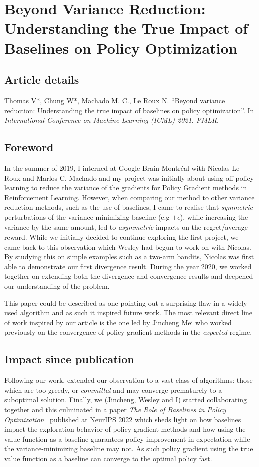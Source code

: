 \chapter{Beyond Variance Reduction: Understanding the True Impact of Baselines on Policy Optimization}
\label{chapter:baselines}
\section*{Article details}
Thomas V*, Chung W*, Machado M. C., Le Roux N. ``Beyond variance reduction: Understanding the true impact of baselines on policy optimization''. In \emph{International Conference on Machine Learning (ICML) 2021. PMLR}.

\section*{Foreword}
In the summer of 2019, I interned at Google Brain Montr\'{e}al with Nicolas Le Roux and Marlos C. Machado and my project was initially about using off-policy learning to reduce the variance of the gradients for Policy Gradient methods in Reinforcement Learning. However, when comparing our method to other variance reduction methods, such as the use of baselines, I came to realise that \emph{symmetric} perturbations of the variance-minimizing baseline (e.g $\pm \epsilon$), while increasing the variance by the same amount, led to \emph{asymmetric} impacts on the regret/average reward. While we initially decided to continue exploring the first project, we came back to this observation which Wesley had begun to work on with Nicolas. By studying this on simple examples such as a two-arm bandits, Nicolas was first able to demonstrate our first divergence result. During the year 2020, we worked together on extending both the divergence and convergence results and deepened our understanding of the problem.

This paper could be described as one pointing out a surprising flaw in a widely used algorithm and as such it inspired future work. The most relevant direct line of work inspired by our article is the one led by Jincheng Mei who worked previously on the convergence of policy gradient methods in the \emph{expected} regime. 

\section*{Impact since publication}
Following our work, \citet{mei2021understanding} extended our observation to a vast class of algorithms: those which are too greedy, or \emph{committal} and may converge prematurely to a suboptimal solution. Finally, we (Jincheng, Wesley and I) started collaborating together and this culminated in a paper \emph{The Role of Baselines in Policy Optimization}~\citep{mei2022role} published at NeurIPS 2022 which sheds light on how baselines impact the exploration behavior of policy gradient methods and how using the value function as a baseline guarantees policy improvement in expectation while the variance-minimizing baseline may not. As such policy gradient using the true value function as a baseline can converge to the optimal policy fast.


